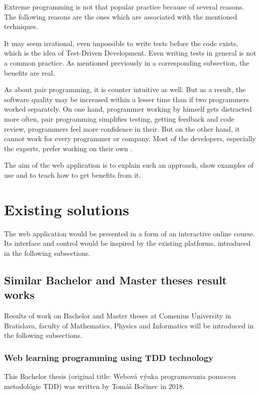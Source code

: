 Extreme programming is not that popular practice because of several reasons. The following reasons are the ones which are associated with the mentioned techniques.

It may seem irrational, even impossible to write tests before the code exists, which is the idea of Test-Driven Development. Even writing tests in general is not a common practice. As mentioned previously in a corresponding subsection, the benefits are real.

As about pair programming, it is counter intuitive as well. But as a result, the software quality may be increased within a lesser time than if two programmers worked separately. On one hand, programmer working by himself gets distracted more often, pair programming simplifies testing, getting feedback and code review, programmers feel more confidence in their. But on the other hand, it cannot work for every programmer or company. Most of the developers, especially the experts, prefer working on their own \cite[Two by Two]{xp_howto}.

The aim of the web application is to explain such an approach, show examples of use and to teach how to get benefits from it.


\section{Existing solutions}

The web application would be presented in a form of an interactive online course. Its interface and control would be inspired by the existing platforms, introduced in the following subsections.

\subsection{Similar Bachelor and Master theses result works}

Results of work on Bachelor and Master theses at Comenius University in Bratislava, faculty of Mathematics, Physics and Informatics will be introduced in the following subsections.

\subsubsection{Web learning programming using TDD technology}

This Bachelor thesis (original title: Webová výuka programovania pomocou metodológie TDD) was written by Tomáš Bočinec in 2018.


